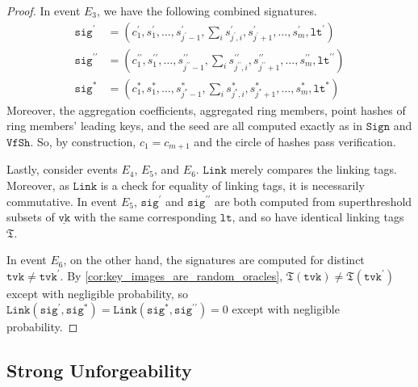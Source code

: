 \documentclass[11pt]{article}
\theoremstyle{definition}
\newcommand{\lt}{\texttt{lt}}
\newcommand{\tvk}{\texttt{tvk}}
\newcommand{\VK}{\underline{\texttt{vk}}}
\newcommand{\sig}{\texttt{sig}}
\newcommand{\sign}{\texttt{Sign}}
\newcommand{\link}{\texttt{Link}}
\newcommand{\verifyshare}{\texttt{VfSh}}
\begin{document}
\begin{proof}
In event $E_3$, we have the following combined signatures.
\begin{align*}
\sig^\prime &= (c_1^\prime, s_1^\prime, \ldots, s_{j^\prime - 1}^\prime, \sum_i s_{j^\prime, i}^\prime, s_{j^\prime + 1}^\prime, \ldots, s_m^\prime, \lt^\prime) \\
\sig^{\prime \prime} &= (c_1^{\prime \prime}, s_1^{\prime \prime}, \ldots, s_{j^{\prime \prime} - 1}^{\prime \prime}, \sum_i s_{j^{\prime \prime}, i}^{\prime \prime}, s_{j^{\prime \prime} + 1}^{\prime \prime}, \ldots, s_m^{\prime \prime}, \lt^{\prime \prime}) \\
\sig^* &= (c_1^*, s_1^*, \ldots, s_{j^* - 1}^*, \sum_i s_{j^*, i}^*, s_{j^* + 1}^*, \ldots, s_m^*, \lt^*) 
\end{align*}
Moreover, the aggregation coefficients, aggregated ring members, point hashes of ring members' leading keys, and the seed are all computed exactly as in $\sign$ and $\verifyshare$. So, by construction, $c_1 = c_{m+1}$ and the circle of hashes pass verification.

Lastly, consider events $E_4$, $E_5$, and $E_6$. $\link$ merely compares the linking tags. Moreover, as $\link$ is a check for equality of linking tags, it is necessarily commutative.
In event $E_5$, $\sig^\prime$ and $\sig^{\prime \prime}$ are both computed from superthreshold subsets of $\VK$ with the same corresponding $\lt$, and so have identical linking tags $\mathfrak{T}$. 

In event $E_6$, on the other hand, the signatures are computed for distinct $\tvk \neq \tvk^\prime$. By  \cref{cor:key_images_are_random_oracles}, $\mathfrak{T}(\tvk) \neq \mathfrak{T}(\tvk^\prime)$ except with negligible probability, so $\link(\sig^\prime, \sig^*) = \link(\sig^*, \sig^{\prime \prime}) = 0$ except with negligible probability.\end{proof}


\subsection{Strong Unforgeability}
\end{document}
